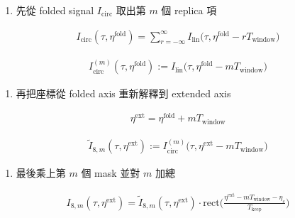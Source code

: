 \documentclass[11pt]{article}
\providecommand{\tightlist}{%
  \setlength{\itemsep}{0pt}\setlength{\parskip}{0pt}}
\begin{document}
\begin{enumerate}
\def\labelenumi{\arabic{enumi}.}
\tightlist
\item
  先從 folded signal \(I_{\mathrm{circ}}\) 取出第 \(m\) 個 replica 項
\end{enumerate}

\begin{equation}
\begin{aligned}
I_{\mathrm{circ}}(\tau,\eta^{\mathrm{fold}})=\sum_{r=-\infty}^{\infty}I_{\mathrm{lin}}\biggl(\tau,\eta^{\mathrm{fold}}-rT_{\mathrm{window}}\biggr)
\end{aligned}
\end{equation}

\begin{equation}
\begin{aligned}
I_{\mathrm{circ}}^{(m)}(\tau,\eta^{\mathrm{fold}}):=I_{\mathrm{lin}}\biggl(\tau,\eta^{\mathrm{fold}}-mT_{\mathrm{window}}\biggr)
\end{aligned}
\end{equation}

\begin{enumerate}
\def\labelenumi{\arabic{enumi}.}
\setcounter{enumi}{1}
\tightlist
\item
  再把座標從 folded axis 重新解釋到 extended axis
\end{enumerate}

\begin{equation}
\begin{aligned}
\eta^{\mathrm{ext}}=\eta^{\mathrm{fold}}+mT_{\mathrm{window}}
\end{aligned}
\end{equation}

\begin{equation}
\begin{aligned}
\widetilde I_{8,m}(\tau,\eta^{\mathrm{ext}}):=I_{\mathrm{circ}}^{(m)}\biggl(\tau,\eta^{\mathrm{ext}}-mT_{\mathrm{window}}\biggr)
\end{aligned}
\end{equation}

\begin{enumerate}
\def\labelenumi{\arabic{enumi}.}
\setcounter{enumi}{2}
\tightlist
\item
  最後乘上第 \(m\) 個 mask 並對 \(m\) 加總
\end{enumerate}

\begin{equation}
\begin{aligned}
I_{8,m}(\tau,\eta^{\mathrm{ext}})=\widetilde I_{8,m}(\tau,\eta^{\mathrm{ext}})\cdot
\mathrm{rect}\biggl(\frac{\eta^{\mathrm{ext}}-mT_{\mathrm{window}}-\eta_c}{T_{\mathrm{keep}}}\biggr)
\end{aligned}
\end{equation}
\end{document}
